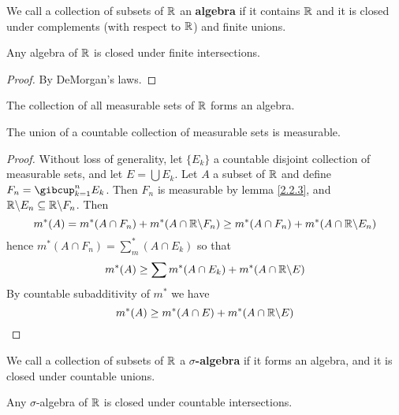 \begin{definition}
    We call a collection of subsets of $\mathbb{R}$ an  \textbf{algebra} if it contains
    $\mathbb{R}$ and it is closed under complements  (with respect to $\mathbb{R}$) and finite
    unions.
\end{definition}

\begin{lemma}\label{2.2.5}
    Any algebra of $\mathbb{R}$ is closed under finite intersections.
\end{lemma}
\begin{proof}
    By DeMorgan's laws.
\end{proof}

\begin{theorem}\label{2.2.6}
    The collection of all measurable sets of $\mathbb{R}$ forms an algebra.
\end{theorem}

\begin{lemma}\label{2.2.7}
    The union of a countable collection of measurable sets is measurable.
\end{lemma}
\begin{proof}
    Without loss of generality, let $\{E_k\}$ a countable disjoint collection of
    measurable sets, and let $E=\bigcup{E_k}$. Let $A$ a subset of  $\mathbb{R}$ and
    define  $F_n=\gibcup_{k=1}^n{E_k}$. Then $F_n$ is measurable by lemma
    \ref{2.2.3}, and $\mathbb{R}\backslash E_n \subseteq \mathbb{R}\backslash F_n$. Then
    \begin{equation*}
        m^\ast(A)=m^\ast(A \cap F_n)+m^\ast(A \cap \mathbb{R}\backslash F_n)
        \geq m^\ast(A \cap F_n)+m^\ast(A \cap \mathbb{R}\backslash E_n)
    \end{equation*}
    hence $m^\ast(A \cap F_n)=\sum_m^\ast(A \cap E_k)$ so that
    \begin{equation*}
        m^\ast(A) \geq \sum{m^\ast(A \cap E_k)}+m^\ast(A \cap \mathbb{R}\backslash E)
    \end{equation*}
    By countable subadditivity of $m^\ast$ we have
    \begin{equation*}
        m^\ast(A) \geq m^\ast(A \cap E)+m^\ast(A \cap \mathbb{R}\backslash E)
    \end{equation*}
\end{proof}

\begin{definition}
    We call a collection of subsets of $\mathbb{R}$ a  \textbf{$\sigma$-algebra} if it
    forms an algebra, and it is closed under countable unions.
\end{definition}

\begin{lemma}\label{2.2.8}
    Any $\sigma$-algebra of  $\mathbb{R}$ is closed under countable intersections.
\end{lemma}

